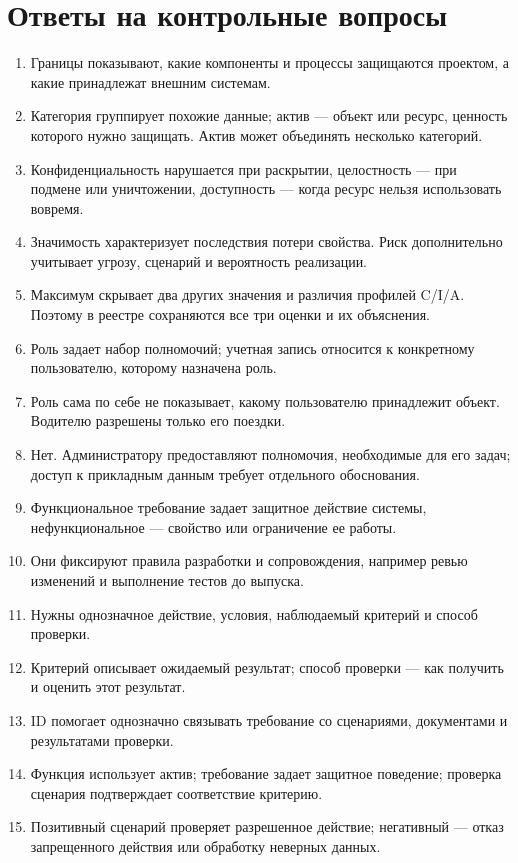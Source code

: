 \documentclass[12pt,a4paper]{article}
\begin{document}
\section{Ответы на контрольные вопросы}
\begin{enumerate}
\item Границы показывают, какие компоненты и процессы защищаются проектом, а какие принадлежат внешним системам.
\item Категория группирует похожие данные; актив — объект или ресурс, ценность которого нужно защищать. Актив может объединять несколько категорий.
\item Конфиденциальность нарушается при раскрытии, целостность — при подмене или уничтожении, доступность — когда ресурс нельзя использовать вовремя.
\item Значимость характеризует последствия потери свойства. Риск дополнительно учитывает угрозу, сценарий и вероятность реализации.
\item Максимум скрывает два других значения и различия профилей C/I/A. Поэтому в реестре сохраняются все три оценки и их объяснения.
\item Роль задает набор полномочий; учетная запись относится к конкретному пользователю, которому назначена роль.
\item Роль сама по себе не показывает, какому пользователю принадлежит объект. Водителю разрешены только его поездки.
\item Нет. Администратору предоставляют полномочия, необходимые для его задач; доступ к прикладным данным требует отдельного обоснования.
\item Функциональное требование задает защитное действие системы, нефункциональное — свойство или ограничение ее работы.
\item Они фиксируют правила разработки и сопровождения, например ревью изменений и выполнение тестов до выпуска.
\item Нужны однозначное действие, условия, наблюдаемый критерий и способ проверки.
\item Критерий описывает ожидаемый результат; способ проверки — как получить и оценить этот результат.
\item ID помогает однозначно связывать требование со сценариями, документами и результатами проверки.
\item Функция использует актив; требование задает защитное поведение; проверка сценария подтверждает соответствие критерию.
\item Позитивный сценарий проверяет разрешенное действие; негативный — отказ запрещенного действия или обработку неверных данных.

\end{enumerate}
\end{document}
